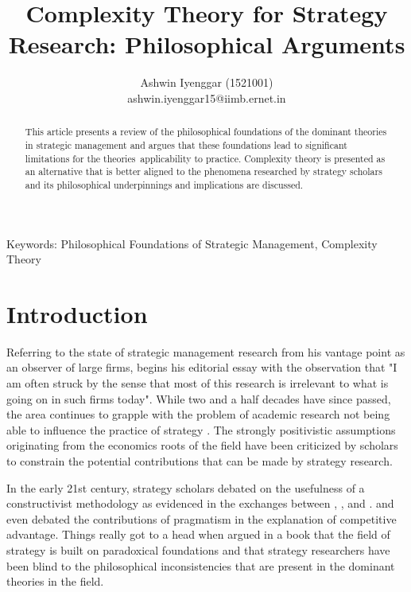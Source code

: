 \documentclass[12pt]{article}
\begin{document}
\title{Complexity Theory for Strategy Research: Philosophical Arguments}
\author{Ashwin Iyenggar  (1521001) \\ ashwin.iyenggar15@iimb.ernet.in} 


\maketitle

\begin{abstract}
This article presents a review of the philosophical foundations of the dominant theories in strategic management and argues that these foundations lead to significant limitations for the theories\textquotesingle  \ applicability to practice.  Complexity theory is presented as an alternative that is better aligned to the phenomena researched by strategy scholars and its philosophical underpinnings and implications are discussed.
\end{abstract}


{Keywords:} Philosophical Foundations of Strategic Management, Complexity Theory

\section{Introduction}\label{S:Introduction}
Referring to the state of strategic management research from his vantage point as an observer of large firms, \cite{Bettis1991} begins his editorial essay with the observation that "I am often struck by the sense that most of this research is irrelevant to what is going on in such firms today". While two and a half decades have since passed, the area continues to grapple with the problem of academic research not being able to influence the practice of strategy \citep{Economist2007PracticallyIrrelevant}. The strongly positivistic assumptions originating from the economics roots of the field have been criticized by scholars to constrain the potential contributions that can be made by strategy research. 

In the early 21st century, strategy scholars debated on the usefulness of a constructivist methodology as evidenced in the exchanges between \cite{Mir2000}, \cite{Kwan2001}, and \cite{Mir2001}. \cite{Durand2002} and \cite{Powell2002} even debated the contributions of pragmatism in the explanation of competitive advantage. Things really got to a head when \cite{Rasche2008}   argued in a book  that the field of strategy is built on paradoxical foundations and that strategy researchers have been blind to the philosophical inconsistencies that are present in the dominant theories in the field. 
\end{document}
